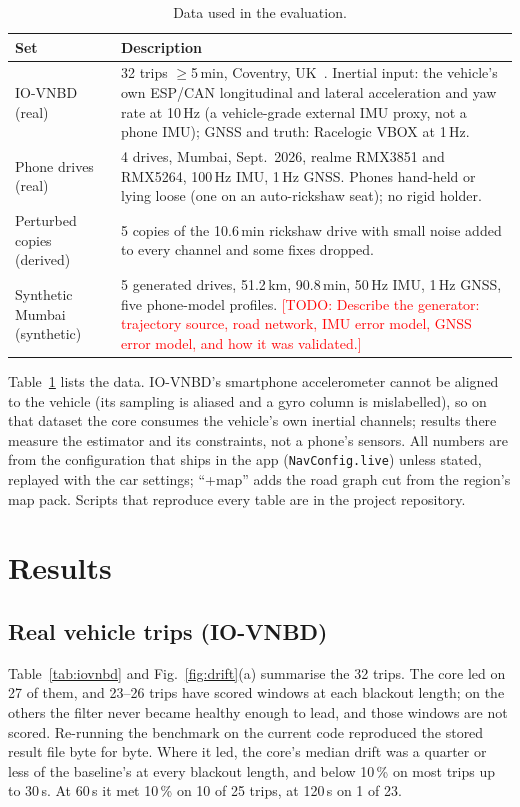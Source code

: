 \documentclass[conference]{IEEEtran}
\newcommand{\todo}[1]{\textcolor{red}{[TODO: #1]}}
\begin{document}
\begin{table}[t]
\centering
\caption{Data used in the evaluation.}
\label{tab:data}
\begin{tabular}{@{}p{2.1cm}p{5.8cm}@{}}
\toprule
Set & Description\\
\midrule
IO-VNBD (real) & 32 trips $\geq$5\,min, Coventry, UK~\cite{onyekpe2021iovnbd}. Inertial input: the vehicle's own ESP/CAN longitudinal and lateral acceleration and yaw rate at 10\,Hz (a vehicle-grade external IMU proxy, not a phone IMU); GNSS and truth: Racelogic VBOX at 1\,Hz.\\
Phone drives (real) & 4 drives, Mumbai, Sept.\ 2026, realme RMX3851 and RMX5264, 100\,Hz IMU, 1\,Hz GNSS. Phones hand-held or lying loose (one on an auto-rickshaw seat); no rigid holder.\\
Perturbed copies (derived) & 5 copies of the 10.6\,min rickshaw drive with small noise added to every channel and some fixes dropped.\\
Synthetic Mumbai (synthetic) & 5 generated drives, 51.2\,km, 90.8\,min, 50\,Hz IMU, 1\,Hz GNSS, five phone-model profiles. \todo{Describe the generator: trajectory source, road network, IMU error model, GNSS error model, and how it was validated.}\\
\bottomrule
\end{tabular}
\end{table}

Table~\ref{tab:data} lists the data. IO-VNBD's smartphone accelerometer cannot
be aligned to the vehicle (its sampling is aliased and a gyro column is
mislabelled), so on that dataset the core consumes the vehicle's own inertial
channels; results there measure the estimator and its constraints, not a
phone's sensors. All numbers are from the configuration that ships in the app
(\texttt{NavConfig.live}) unless stated, replayed with the car settings;
``+map'' adds the road graph cut from the region's map pack. Scripts that
reproduce every table are in the project repository.

\section{Results}
\label{sec:results}

\subsection{Real vehicle trips (IO-VNBD)}
Table~\ref{tab:iovnbd} and Fig.~\ref{fig:drift}(a) summarise the 32 trips. The
core led on 27 of them, and 23--26 trips have scored windows at each blackout
length; on the others the filter never became healthy enough to lead, and
those windows are not scored. Re-running the benchmark on the current code
reproduced the stored result file byte for byte. Where it led, the core's median
drift was a quarter or less of the baseline's at every blackout length, and
below 10\,\% on most trips up to 30\,s. At 60\,s it met 10\,\% on 10 of 25
trips, at 120\,s on 1 of 23.
\end{document}
